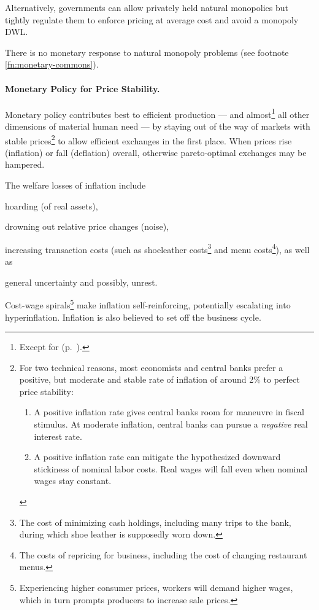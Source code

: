 Alternatively, governments can allow privately held natural monopolies but tightly regulate them to enforce pricing at average cost and avoid a monopoly \gls{DWL}.

There is no monetary response to natural monopoly problems (see footnote \ref{fn:monetary-commons}).

\paragraph{Monetary Policy for Price Stability.}  \label{sec:price-stability} Monetary policy contributes best to efficient production --- and almost\footnote{
	Except for  (p.~\pageref{sec:monetary-stimulus}).}
all other dimensions of material human need --- by staying out of the way of markets with stable prices\footnote{
	For two technical reasons, most economists and central banks prefer a positive, but moderate and stable rate of inflation of around 2\% to perfect price stability:
	\begin{enumerate}
		\item A positive inflation rate gives central banks room for maneuvre in fiscal stimulus. At moderate inflation, central banks can pursue a \emph{negative} real interest rate.
		\item A positive inflation rate can mitigate the hypothesized downward stickiness of nominal labor costs. Real wages will fall even when nominal wages stay constant.%
	\end{enumerate}}
to allow efficient exchanges in the first place. When prices rise (inflation) or fall (deflation) overall, otherwise pareto-optimal exchanges may be hampered.

The welfare losses of inflation include \begin{inparaenum}
	\item hoarding (of real assets),
	\item drowning out relative price changes (noise),
	\item increasing transaction costs (such as shoeleather costs\footnote{
		The cost of minimizing cash holdings, including many trips to the bank, during which shoe leather is supposedly worn down.}
		and menu costs\footnote{
			The costs of repricing for business, including the cost of changing restaurant menus.}), as well as
	\item general uncertainty and possibly, unrest.
	\end{inparaenum}
Cost-wage spirals\footnote{Experiencing higher consumer prices, workers will demand higher wages, which in turn prompts producers to increase sale prices.} make inflation self-reinforcing, potentially escalating into hyperinflation. Inflation is also believed to set off the business cycle. %

